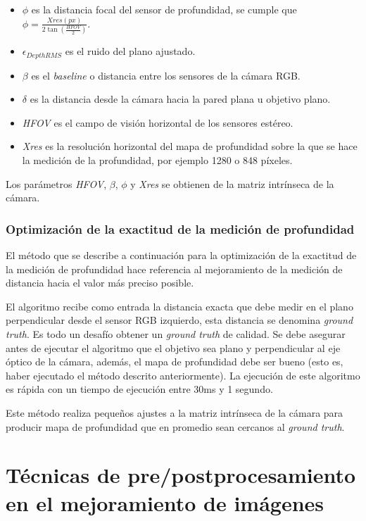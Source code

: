 \begin{itemize}
	\item $\phi$ es la distancia focal del sensor de profundidad, se cumple que $\phi = \frac{Xres(px)}{2\tan(\frac{HFOV}{2})}$.
	\item $\epsilon_{DepthRMS}$ es el ruido del plano ajustado.
	\item $\beta$ es el \textit{baseline} o distancia entre los sensores de la cámara RGB.
	\item $\delta$ es la distancia desde la cámara hacia la pared plana u objetivo plano.
	\item \textit{HFOV} es el campo de visión horizontal de los sensores estéreo.
	\item \textit{Xres} es la resolución horizontal del mapa de profundidad sobre la que se hace la medición de la profundidad, por ejemplo 1280 o 848 píxeles.
\end{itemize} 

Los parámetros \textit{HFOV}, $\beta$, $\phi$ y \textit{Xres} se obtienen de la matriz intrínseca de la cámara. 

\subsubsection{Optimización de la exactitud de la medición de profundidad}

El método que se describe a continuación para la optimización de la exactitud de la medición de profundidad hace referencia al mejoramiento de la medición de distancia hacia el valor más preciso posible.

El algoritmo recibe como entrada la distancia exacta que debe medir en el plano perpendicular desde el sensor RGB izquierdo, esta distancia se denomina \textit{ground truth}. Es todo un desafío obtener un \textit{ground truth} de calidad. Se debe asegurar antes de ejecutar el algoritmo que el objetivo sea plano y perpendicular al eje óptico de la cámara, además, el mapa de profundidad debe ser bueno (esto es, haber ejecutado el método descrito anteriormente). La ejecución de este algoritmo es rápida con un tiempo de ejecución entre 30ms y 1 segundo. 

Este método realiza pequeños ajustes a la matriz intrínseca de la cámara para producir mapa de profundidad que en promedio sean cercanos al \textit{ground truth}. 

\section{Técnicas de pre/postprocesamiento en el mejoramiento de imágenes}\label{section:imgEnh}

